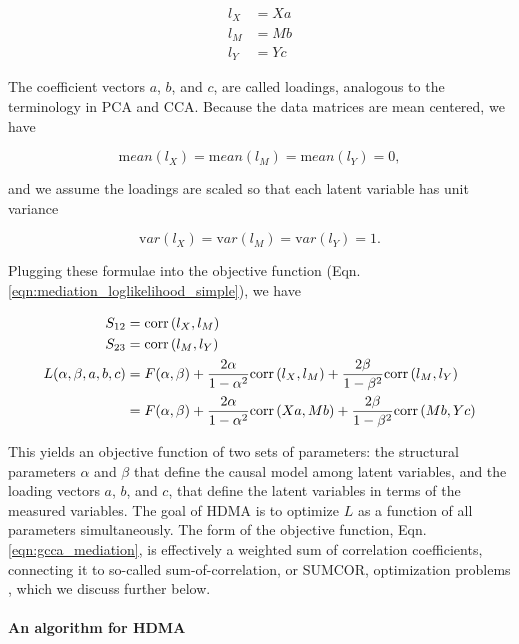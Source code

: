 \documentclass[
]{article}
\begin{document}
\begin{align}
l_X &= Xa \\
l_M &= Mb \\
l_Y &= Yc
\end{align}

The coefficient vectors \(a\), \(b\), and \(c\), are called loadings,
analogous to the terminology in PCA and CCA. Because the data matrices
are mean centered, we have

\begin{equation}
{\mathrm mean}(l_X) = {\mathrm mean}(l_M) = {\mathrm mean}(l_Y) = 0,
\end{equation}

and we assume the loadings are scaled so that each latent variable has
unit variance

\begin{equation}
{\mathrm var}(l_X) = {\mathrm var}(l_M) = {\mathrm var}(l_Y) = 1.
\end{equation}

Plugging these formulae into the objective function (Eqn.
\ref{eqn:mediation_loglikelihood_simple}), we have

\begin{align}
S_{12} &= {\rm corr}\left(l_X, l_M\right)\\
    S_{23} &= {\rm corr}\left(l_M, l_Y\right)\\
    \label{eqn:gcca_mediation}
    L(\alpha, \beta, a,b,c) &= F(\alpha, \beta) + \frac{2\alpha}{1-\alpha^2} {\rm corr}\left(l_X, l_M\right) + \frac{2\beta}{1-\beta^2} {\rm corr}\left(l_M, l_Y\right) \\ 
    &= F(\alpha, \beta) + \frac{2\alpha}{1-\alpha^2} {\rm corr}\left(Xa, Mb\right) + \frac{2\beta}{1-\beta^2} {\rm corr}\left(Mb, Yc\right)
\end{align}

This yields an objective function of two sets of parameters: the
structural parameters \(\alpha\) and \(\beta\) that define the causal
model among latent variables, and the loading vectors \(a\), \(b\), and
\(c\), that define the latent variables in terms of the measured
variables. The goal of HDMA is to optimize \(L\) as a function of all
parameters simultaneously. The form of the objective function, Eqn.
\ref{eqn:gcca_mediation}, is effectively a weighted sum of correlation
coefficients, connecting it to so-called sum-of-correlation, or SUMCOR,
optimization problems \cite{tenenhaus2011regularized}, which we discuss
further below.

\paragraph{An algorithm for HDMA}\label{an-algorithm-for-hdma}
\end{document}

